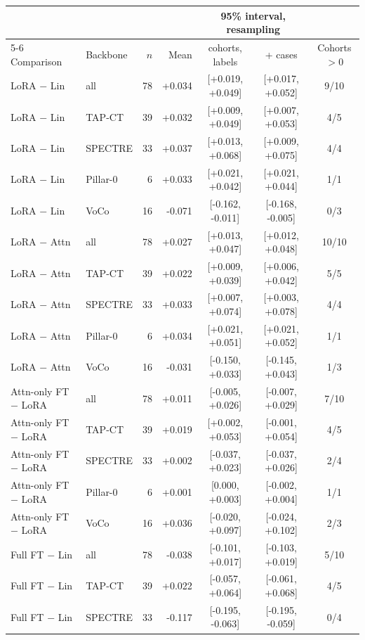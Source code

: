 \begin{tabular}{llrrccc}
\toprule
 & & & & \multicolumn{2}{c}{95\% interval, resampling} & \\
\cmidrule(lr){5-6}
Comparison & Backbone & $n$ & Mean & cohorts, labels & + cases & Cohorts $>0$ \\
\midrule
LoRA $-$ Lin & all & 78 & +0.034 & [+0.019, +0.049] & [+0.017, +0.052] & 9/10 \\
LoRA $-$ Lin & TAP-CT & 39 & +0.032 & [+0.009, +0.049] & [+0.007, +0.053] & 4/5 \\
LoRA $-$ Lin & SPECTRE & 33 & +0.037 & [+0.013, +0.068] & [+0.009, +0.075] & 4/4 \\
LoRA $-$ Lin & Pillar-0 & 6 & +0.033 & [+0.021, +0.042] & [+0.021, +0.044] & 1/1 \\
LoRA $-$ Lin & VoCo & 16 & -0.071 & [-0.162, -0.011] & [-0.168, -0.005] & 0/3 \\
\addlinespace[2pt]
LoRA $-$ Attn & all & 78 & +0.027 & [+0.013, +0.047] & [+0.012, +0.048] & 10/10 \\
LoRA $-$ Attn & TAP-CT & 39 & +0.022 & [+0.009, +0.039] & [+0.006, +0.042] & 5/5 \\
LoRA $-$ Attn & SPECTRE & 33 & +0.033 & [+0.007, +0.074] & [+0.003, +0.078] & 4/4 \\
LoRA $-$ Attn & Pillar-0 & 6 & +0.034 & [+0.021, +0.051] & [+0.021, +0.052] & 1/1 \\
LoRA $-$ Attn & VoCo & 16 & -0.031 & [-0.150, +0.033] & [-0.145, +0.043] & 1/3 \\
\addlinespace[2pt]
Attn-only FT $-$ LoRA & all & 78 & +0.011 & [-0.005, +0.026] & [-0.007, +0.029] & 7/10 \\
Attn-only FT $-$ LoRA & TAP-CT & 39 & +0.019 & [+0.002, +0.053] & [-0.001, +0.054] & 4/5 \\
Attn-only FT $-$ LoRA & SPECTRE & 33 & +0.002 & [-0.037, +0.023] & [-0.037, +0.026] & 2/4 \\
Attn-only FT $-$ LoRA & Pillar-0 & 6 & +0.001 & [0.000, +0.003] & [-0.002, +0.004] & 1/1 \\
Attn-only FT $-$ LoRA & VoCo & 16 & +0.036 & [-0.020, +0.097] & [-0.024, +0.102] & 2/3 \\
\addlinespace[2pt]
Full FT $-$ Lin & all & 78 & -0.038 & [-0.101, +0.017] & [-0.103, +0.019] & 5/10 \\
Full FT $-$ Lin & TAP-CT & 39 & +0.022 & [-0.057, +0.064] & [-0.061, +0.068] & 4/5 \\
Full FT $-$ Lin & SPECTRE & 33 & -0.117 & [-0.195, -0.063] & [-0.195, -0.059] & 0/4 \\

\end{tabular}
